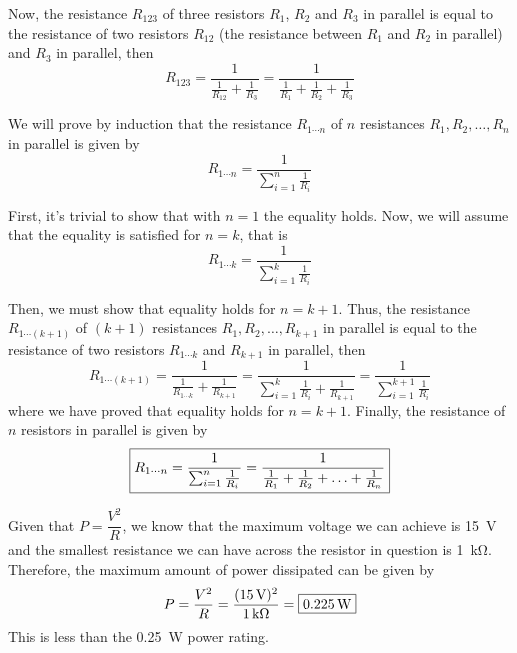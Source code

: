 Now, the resistance $R_{123}$ of three resistors $R_{1}$, $R_{2}$ and $R_{3}$ in parallel is equal to the resistance of two resistors $R_{12}$ (the resistance between $R_{1}$ and $R_{2}$ in parallel) and $R_{3}$ in parallel, then \[R_{123} = \frac{1}{\frac{1}{R_{12}}+\frac{1}{R_{3}}} = \frac{1}{\frac{1}{R_{1}}+\frac{1}{R_{2}}+\frac{1}{R_{3}}}\]

We will prove by induction that the resistance $R_{1\cdots n}$ of $n$ resistances $R_{1}, R_{2}, \ldots, R_{n}$ in parallel is given by \[R_{1\cdots n} = \dfrac{1}{\sum_{i=1}^{n}\frac{1}{R_{i}}}\]

First, it's trivial to show that with $n = 1$ the equality holds. Now, we will assume that the equality is satisfied for $n = k$, that is
\[R_{1\cdots k} = \dfrac{1}{\sum_{i=1}^{k}\frac{1}{R_{i}}}\]

Then, we must show that equality holds for $n = k+1$. Thus, the resistance $R_{1\cdots (k+1)}$ of $(k+1)$ resistances $R_{1}, R_{2}, \ldots, R_{k+1}$ in parallel is equal to the resistance of two resistors $R_{1\cdots k}$ and $R_{k+1}$ in parallel, then \[R_{1\cdots (k+1)} = \frac{1}{\frac{1}{R_{1\cdots k}}+\frac{1}{R_{k+1}}} = \frac{1}{\sum_{i=1}^{k}\frac{1}{R_{i}}+\frac{1}{R_{k+1}}} = \frac{1}{\sum_{i=1}^{k+1}\frac{1}{R_{i}}}\]
where we have proved that equality holds for $n = k+1$. Finally, the resistance of $n$ resistors in parallel is given by \[\boxed{R_{1\cdots n} = \dfrac{1}{\sum_{i=1}^{n}\frac{1}{R_{i}}} = \frac{1}{\frac{1}{R_{1}}+\frac{1}{R_{2}}+\ldots+\frac{1}{R_{n}}}}\]

Given that $P = \dfrac{V^2}{R}$, we know that the maximum voltage we can achieve is \SI{15}{\V} and the smallest resistance we can have across the resistor in question is \SI{1}{\kohm}. Therefore, the maximum amount of power dissipated can be given by \[P = \frac{V^2}{R} = \frac{(\SI{15}{\V})^2}{\SI{1}{\kohm}} = \mans{\SI{0.225}{\W}}\]
This is less than the \SI{0.25}{\W} power rating.


